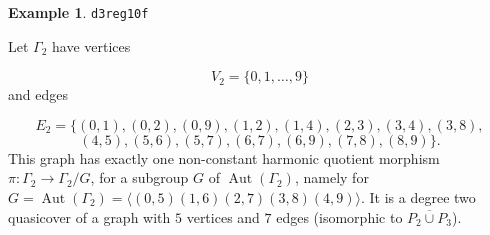 \documentclass[12pt,letterpaper]{article}
\theoremstyle{definition}
\newtheorem{example}[theorem]{Example}
\DeclareMathOperator{\Aut}{Aut}
\begin{document}
\begin{example}%
\label{example:d3reg10f}
  {\tt d3reg10f}\newline
{\rm  
Let $\Gamma_2$ have vertices

\[
V_2=\{0,1,\dots,9\}
\]
and edges

\[
E_2 = \{
(0, 1), (0, 2), (0, 9), (1, 2), (1, 4), (2, 3), (3, 4), (3, 8), 
\]
\[
(4, 5), (5, 6), (5, 7), (6, 7), (6, 9), (7, 8), (8, 9)
\}.
\]
This graph has exactly one non-constant harmonic quotient
morphism $\pi: \Gamma_2\to \Gamma_2/G$, for a subgroup
$G$ of $\Aut(\Gamma_2)$, namely for
$G=\Aut(\Gamma_2)=\langle (0,5)(1,6)(2,7)(3,8)(4,9)\rangle$.
It is a degree two quasicover of a graph with $5$ vertices and $7$ edges
(isomorphic to $\overline{P_2\cup P_3}$).

}
\end{example}
\end{document}
